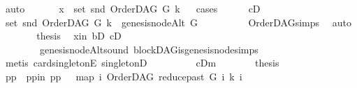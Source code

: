 \begin{isabellebody}
\ auto\ \isanewline
\ \ \isamarkupfalse%
\ \isamarkupfalse%
\ {\isachardoublequoteopen}x\ {\isasymin}\ set\ {\isacharparenleft}{\kern0pt}snd\ {\isacharparenleft}{\kern0pt}OrderDAG\ G\ k{\isacharparenright}{\kern0pt}{\isacharparenright}{\kern0pt}{\isachardoublequoteclose}\isanewline
\ \ \isamarkupfalse%
{\isacharparenleft}{\kern0pt}cases{\isacharparenright}{\kern0pt}\isanewline
\ \ \ \ \isamarkupfalse%
\ {\isacharparenleft}{\kern0pt}cD{}{\isacharparenright}{\kern0pt}\isanewline
\ \ \ \ \isamarkupfalse%
\ \isamarkupfalse%
\ {\isachardoublequoteopen}set\ {\isacharparenleft}{\kern0pt}snd\ {\isacharparenleft}{\kern0pt}OrderDAG\ G\ k{\isacharparenright}{\kern0pt}{\isacharparenright}{\kern0pt}\ {\isacharequal}{\kern0pt}\ {\isacharbraceleft}{\kern0pt}genesis{\isacharunderscore}{\kern0pt}nodeAlt\ G{\isacharbraceright}{\kern0pt}{\isachardoublequoteclose}\ \isanewline
\ \ \ \ \ \ \isamarkupfalse%
\ {}\ OrderDAG{\isachardot}{\kern0pt}simps\ \isamarkupfalse%
\ auto\isanewline
\ \ \ \ \isamarkupfalse%
\ \isamarkupfalse%
\ {\isacharquery}{\kern0pt}thesis\ \isamarkupfalse%
\ x{\isacharunderscore}{\kern0pt}in\ bD\ cD{}\isanewline
\ \ \ \ \ \ \ \ genesis{\isacharunderscore}{\kern0pt}nodeAlt{\isacharunderscore}{\kern0pt}sound\ blockDAG{\isachardot}{\kern0pt}is{\isacharunderscore}{\kern0pt}genesis{\isacharunderscore}{\kern0pt}node{\isachardot}{\kern0pt}simps\isanewline
\ \ \ \ \ \ \isamarkupfalse%
\ {}\isanewline
\ \ \ \ \ \ \isamarkupfalse%
\ {\isacharparenleft}{\kern0pt}metis\ card{\isacharunderscore}{\kern0pt}{}{\isacharunderscore}{\kern0pt}singletonE\ singletonD{\isacharparenright}{\kern0pt}\ \isanewline
\ \ \isamarkupfalse%
\isanewline
\ \ \ \ \isamarkupfalse%
\ {\isacharparenleft}{\kern0pt}cDm{\isacharparenright}{\kern0pt}\isanewline
\ \ \ \ \isamarkupfalse%
\ \isamarkupfalse%
\ {\isacharquery}{\kern0pt}thesis\isanewline
\ \ \ \ \isamarkupfalse%
\ {\isacharminus}{\kern0pt}\isanewline
\ \ \ \ \ \ \isamarkupfalse%
\ pp\ \ pp{\isacharunderscore}{\kern0pt}in{\isacharcolon}{\kern0pt}\ {\isachardoublequoteopen}pp\ {\isacharequal}{\kern0pt}\ \ {\isacharparenleft}{\kern0pt}map\ {\isacharparenleft}{\kern0pt}{\isasymlambda}i{\isachardot}{\kern0pt}\ {\isacharparenleft}{\kern0pt}OrderDAG\ {\isacharparenleft}{\kern0pt}reduce{\isacharunderscore}{\kern0pt}past\ G\ i{\isacharparenright}{\kern0pt}\ k{\isacharcomma}{\kern0pt}\ i{\isacharparenright}{\kern0pt}{\isacharparenright}{\kern0pt}\isanewline

\end{isabellebody}
